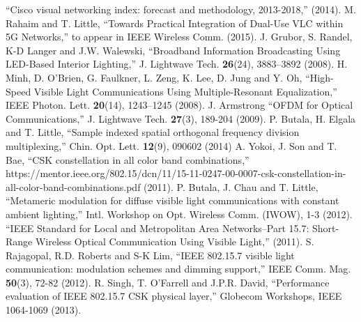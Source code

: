 \documentclass[10pt,letterpaper]{article}
\begin{document}
\begin{thebibliography}{99}
 ``{Cisco visual networking index: forecast and methodology, 2013-2018},'' (2014).
 M. Rahaim and T. Little, ``{Towards Practical Integration of Dual-Use VLC within 5G Networks},'' to appear in IEEE Wireless Comm. (2015).
 J. Grubor, S. Randel, K-D Langer and J.W. Walewski, ``{Broadband Information Broadcasting Using LED-Based Interior Lighting},'' J. Lightwave Tech. {\bf 26}(24), 3883--3892 (2008).
 H. Minh, D. O'Brien, G. Faulkner, L. Zeng, K. Lee, D. Jung and Y. Oh, ``{High-Speed Visible Light Communications Using Multiple-Resonant Equalization},'' IEEE Photon. Lett. {\bf 20}(14), 1243--1245 (2008).
 J. Armstrong ``{OFDM for Optical Communications},'' J. Lightwave Tech. {\bf 27}(3), 189-204 (2009).
 P. Butala, H. Elgala and T. Little, ``{Sample indexed spatial orthogonal frequency division multiplexing},'' Chin. Opt. Lett. {\bf 12}(9), 090602 (2014)
 A. Yokoi, J. Son and T. Bae, ``{CSK constellation in all color band combinations},'' {https://mentor.ieee.org/802.15/dcn/11/15-11-0247-00-0007-csk-constellation-in-all-color-band-combinations.pdf} (2011).
 P. Butala, J. Chau and T. Little, ``{Metameric modulation for diffuse visible light communications with constant ambient lighting},'' Intl. Workshop on Opt. Wireless Comm. (IWOW), 1-3 (2012).
 ``{IEEE Standard for Local and Metropolitan Area Networks--Part 15.7: Short-Range Wireless Optical Communication Using Visible Light},'' (2011).
 S. Rajagopal, R.D. Roberts and S-K Lim, ``{IEEE 802.15.7 visible light communication: modulation schemes and dimming support},'' IEEE Comm. Mag. {\bf 50}(3), 72-82 (2012).
 R. Singh, T. O'Farrell and J.P.R. David, ``{Performance evaluation of IEEE 802.15.7 CSK physical layer},'' Globecom Workshops, IEEE 1064-1069 (2013).


\end{thebibliography}

\end{document}
